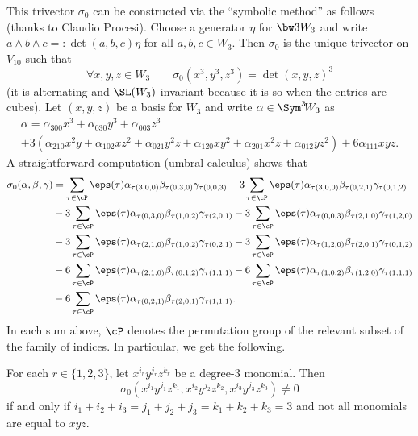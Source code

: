 This trivector $\sigma_0$ can be constructed via the ``symbolic method'' as follows (thanks to Claudio Procesi). Choose a generator $\eta$ for $\bw3W_3$ and write $a\wedge b\wedge c=:\det(a,b,c)\eta$ for all $a,b,c\in W_3$. Then $\sigma_0$ is the unique trivector on $V_{10} $ such that
\[
\forall x,y,z\in W_3\qquad \sigma_0(x^3,y^3,z^3)= \det(x,y,z)^3
\]
(it is alternating and $\SL(W_3)$-invariant because it is so when the entries are cubes). Let $(x,y,z)$ be a basis for $W_3$ and
write $\alpha\in \Sym^3\! W_{3}$ as\vspace*{-5pt}
\begin{multline}\label{coordsim}
\alpha=\alpha_{300}x^3+\alpha_{030}y^3+\alpha_{003}z^3 \\
+3(\alpha_{210}x^2 y+\alpha_{102}x z^2+\alpha_{021}y^2 z+\alpha_{120} x y^2+\alpha_{201}x^2 z
+\alpha_{012}y z^2)+6\alpha_{111}xyz.
\end{multline}
A straightforward computation (umbral calculus) shows that
\begin{align}\label{gransomma}\nonumber
\sigma_0(\alpha,\beta,\gamma)&=\sum\limits_{\tau\in\cP}\eps(\tau)\alpha_{\tau(3,0,0)} \beta_{\tau(0,3,0)} \gamma_{\tau(0,0,3)}
- 3\sum\limits_{\tau\in\cP}\eps(\tau)\alpha_{\tau(3,0,0)} \beta_{\tau(0,2,1)} \gamma_{\tau(0,1,2)} \\\nonumber
&- 3\sum\limits_{\tau\in\cP}\eps(\tau)\alpha_{\tau(0,3,0)} \beta_{\tau(1,0,2)} \gamma_{\tau(2,0,1)}
- 3\sum\limits_{\tau\in\cP}\eps(\tau)\alpha_{\tau(0,0,3)} \beta_{\tau(2,1,0)} \gamma_{\tau(1,2,0)} \\
&-3\sum\limits_{\tau\in\cP}\eps(\tau)\alpha_{\tau(2,1,0)} \beta_{\tau(1,0,2)} \gamma_{\tau(0,2,1)}
-3\sum\limits_{\tau\in\cP}\eps(\tau)\alpha_{\tau(1,2,0)} \beta_{\tau(2,0,1)} \gamma_{\tau(0,1,2)} \\\nonumber
&- 6\sum\limits_{\tau\in\cP}\eps(\tau)\alpha_{\tau(2,1,0)} \beta_{\tau(0,1,2)} \gamma_{\tau(1,1,1)}
- 6\sum\limits_{\tau\in\cP}\eps(\tau)\alpha_{\tau(1,0,2)} \beta_{\tau(1,2,0)} \gamma_{\tau(1,1,1)} \\\nonumber
&- 6\sum\limits_{\tau\in\cP}\eps(\tau)\alpha_{\tau(0,2,1)} \beta_{\tau(2,0,1)} \gamma_{\tau(1,1,1)}.
\end{align}
In each sum above, $\cP$ denotes the permutation group of the relevant subset of the family of indices.
In particular, we get the following.

\begin{lemm}\label{nonzero}
For each $r\in\{1,2,3\}$, let $x^{i_r}y^{j_r}z^{k_r}$ be a degree-$3$ monomial. Then
\[
\sigma_0(x^{i_1}y^{j_1}z^{k_1},x^{i_2}y^{j_2}z^{k_2},x^{i_3}y^{j_3}z^{k_3})\ne0
\]
if and only if $i_1+i_2+i_3=j_1+j_2+j_3=k_1+k_2+k_3=3$ and not all monomials are equal to $xyz$.
\end{lemm}

